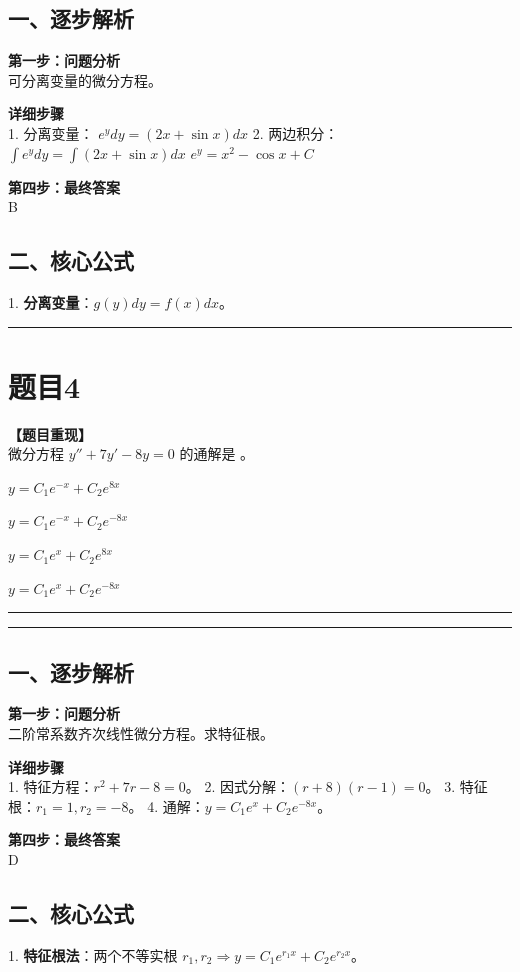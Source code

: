 \documentclass[12pt, a4paper]{ctexart}
\newcommand{\TopSeparator}{
    \par\noindent\rule{\textwidth}{1.5pt}\vspace{0.5em} %
}
\newcommand{\AnalysisSeparator}{
    \par\noindent\rule{\textwidth}{0.5pt}\vspace{0.2em}\hrule\vspace{0.5em} %
}
\newenvironment{RedAnalysis}{
    \par
    \color{red} %
}{
    \par
    \color{black} %
}
\newcommand{\choicesTwo}[4]{
    \begin{enumerate}[label=\Alph*., itemsep=0pt, parsep=0pt, topsep=5pt, labelsep=0.5em]
        \begin{minipage}{0.45\linewidth} \item #1 \end{minipage}
        \begin{minipage}{0.45\linewidth} \item #2 \end{minipage}
        \begin{minipage}{0.45\linewidth} \item #3 \end{minipage}
        \begin{minipage}{0.45\linewidth} \item #4 \end{minipage}
    \end{enumerate}
}
\begin{document}
\begin{RedAnalysis}

\subsection*{一、逐步解析}

\textbf{第一步：问题分析} \\
可分离变量的微分方程。

\textbf{详细步骤} \\
1. 分离变量：
   $e^y dy = (2x + \sin x) dx$
2. 两边积分：
   $\int e^y dy = \int (2x + \sin x) dx$
   $e^y = x^2 - \cos x + C$

\textbf{第四步：最终答案} \\
B

\subsection*{二、核心公式}
1. \textbf{分离变量}：$g(y)dy = f(x)dx$。

\end{RedAnalysis}

\vspace{2em}

\TopSeparator
\section*{题目4}

\textbf{【题目重现】} \\
微分方程 $ y'' + 7y' - 8y = 0 $ 的通解是 \underline{\hspace{1cm}}。
\choicesTwo
{$ y = C_{1}e^{-x} + C_{2}e^{8x} $}
{$ y = C_{1}e^{-x} + C_{2}e^{-8x} $}
{$ y = C_{1}e^{x} + C_{2}e^{8x} $}
{$ y = C_{1}e^{x} + C_{2}e^{-8x} $}

\AnalysisSeparator

\begin{RedAnalysis}

\subsection*{一、逐步解析}

\textbf{第一步：问题分析} \\
二阶常系数齐次线性微分方程。求特征根。

\textbf{详细步骤} \\
1. 特征方程：$r^2 + 7r - 8 = 0$。
2. 因式分解：$(r+8)(r-1) = 0$。
3. 特征根：$r_1 = 1, r_2 = -8$。
4. 通解：$y = C_1 e^{x} + C_2 e^{-8x}$。

\textbf{第四步：最终答案} \\
D

\subsection*{二、核心公式}
1. \textbf{特征根法}：两个不等实根 $r_1, r_2 \Rightarrow y = C_1 e^{r_1 x} + C_2 e^{r_2 x}$。

\end{RedAnalysis}
\end{document}
